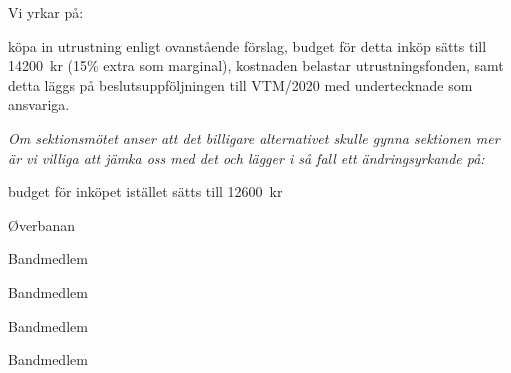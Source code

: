\documentclass[../_main/handlingar.tex]{subfiles}
\begin{document}
Vi yrkar på:
\begin{attsatser}
    \att köpa in utrustning enligt ovanstående förslag,
    \att budget för detta inköp sätts till \SI{14200}{kr} (15\% extra som marginal),
	\att kostnaden belastar utrustningsfonden, samt
	\att detta läggs på beslutsuppföljningen till VTM/2020 med undertecknade som ansvariga.
\end{attsatser}


\textit{Om sektionsmötet anser att det billigare alternativet skulle gynna sektionen mer är vi villiga att jämka oss med det och lägger i så fall ett ändringsyrkande på:}
\begin{attsatser}
    \att budget för inköpet istället sätts till \SI{12600}{kr}
\end{attsatser}

\begin{signatures}{5}
	\mvh
	\signature{William Sjödin}{Øverbanan}
	\signature{Daniel Bakic}{Bandmedlem}
    \signature{Oskar Magnusson}{Bandmedlem}
    \signature{Valter Möller}{Bandmedlem}
    \signature{Lukas Elmlund}{Bandmedlem}
\end{signatures}
\end{document}
